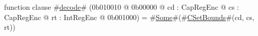 function clause #\hyperref[zdecode]{decode}# (0b010010 @ 0b00000 @ cd : CapRegEnc @ cs : CapRegEnc @ rt : IntRegEnc @ 0b001000) = #\hyperref[zSome]{Some}#(#\hyperref[zCSetBounds]{CSetBounds}#(cd, cs, rt))
